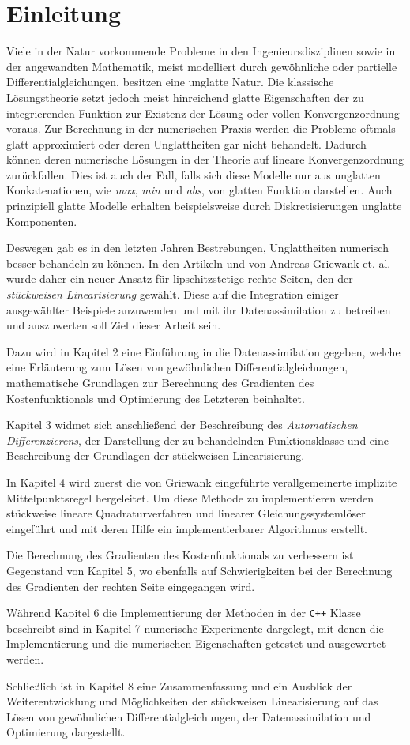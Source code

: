 \chapter{Einleitung}
Viele in der Natur vorkommende Probleme in den Ingenieursdisziplinen sowie in der angewandten Mathematik, meist modelliert durch gewöhnliche oder partielle Differentialgleichungen, besitzen eine unglatte Natur. Die klassische Lösungstheorie setzt jedoch meist hinreichend glatte Eigenschaften der zu integrierenden Funktion zur Existenz der Lösung oder vollen Konvergenzordnung voraus. Zur Berechnung in der numerischen Praxis werden die Probleme oftmals glatt approximiert oder deren Unglattheiten gar nicht behandelt. Dadurch können deren numerische Lösungen in der Theorie auf lineare Konvergenzordnung zurückfallen. Dies ist auch der Fall, falls sich diese Modelle nur aus unglatten Konkatenationen, wie \textit{max}, \textit{min} und \textit{abs}, von glatten Funktion darstellen. Auch prinzipiell glatte Modelle erhalten beispielsweise durch Diskretisierungen unglatte Komponenten.

Deswegen gab es in den letzten Jahren Bestrebungen, Unglattheiten numerisch besser behandeln zu können. In den Artikeln \cite{monster} und \cite{plan} von Andreas Griewank et. al. wurde daher ein neuer Ansatz für lipschitzstetige rechte Seiten, den der \textit{stückweisen Linearisierung} gewählt. Diese auf die Integration einiger ausgewählter Beispiele anzuwenden und mit ihr Datenassimilation zu betreiben und auszuwerten soll Ziel dieser Arbeit sein.

Dazu wird in Kapitel 2 eine Einführung in die Datenassimilation gegeben, welche eine Erläuterung zum Lösen von gewöhnlichen Differentialgleichungen, mathematische Grundlagen zur Berechnung des Gradienten des Kostenfunktionals und Optimierung des Letzteren beinhaltet.

Kapitel 3 widmet sich anschließend der Beschreibung des \textit{Automatischen Differenzierens}, der Darstellung der zu behandelnden Funktionsklasse und eine Beschreibung der Grundlagen der stückweisen Linearisierung.

In Kapitel 4 wird zuerst die von Griewank eingeführte verallgemeinerte implizite Mittelpunktsregel hergeleitet. Um diese Methode zu implementieren werden stückweise lineare Quadraturverfahren und linearer Gleichungssystemlöser eingeführt und mit deren Hilfe ein implementierbarer Algorithmus erstellt.

Die Berechnung des Gradienten des Kostenfunktionals zu verbessern ist Gegenstand von Kapitel 5, wo ebenfalls auf Schwierigkeiten bei der Berechnung des Gradienten der rechten Seite eingegangen wird. 

Während Kapitel 6 die Implementierung der Methoden in der \texttt{C++} Klasse  beschreibt sind in Kapitel 7 numerische Experimente dargelegt, mit denen die Implementierung und die numerischen Eigenschaften getestet und ausgewertet werden.

Schließlich ist in Kapitel 8 eine Zusammenfassung und ein Ausblick der Weiterentwicklung und Möglichkeiten der stückweisen Linearisierung auf das Lösen von gewöhnlichen Differentialgleichungen, der Datenassimilation und Optimierung dargestellt.